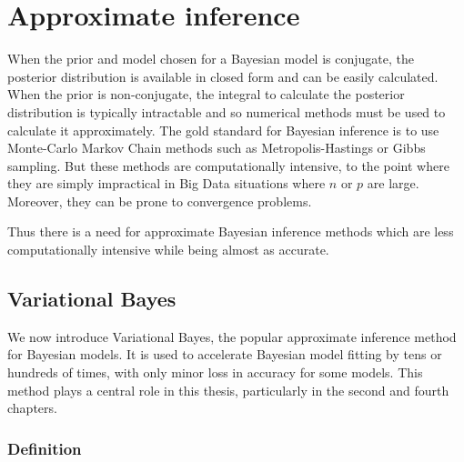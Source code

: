 

\section{Approximate inference}
When the prior and model chosen for a Bayesian model is conjugate, the posterior distribution is available in
closed form and can be easily calculated.
When the prior is non-conjugate, the integral to calculate the posterior distribution is typically intractable
and so numerical methods must be used to calculate it approximately.
The gold standard for Bayesian inference is to use Monte-Carlo Markov Chain methods such as Metropolis-Hastings
or Gibbs sampling. But these methods are computationally intensive, to the point where they are simply
impractical in Big Data situations where $n$ or $p$ are large. Moreover, they can be prone to convergence 
problems.

Thus there is a need for approximate Bayesian inference methods which are less computationally intensive while
being almost as accurate.

 
\subsection{Variational Bayes}
\label{sec:vb}

We now introduce Variational Bayes, the popular approximate inference method for Bayesian models. It is used
to accelerate Bayesian model fitting by tens or hundreds of times, with only minor loss in accuracy for some
models. This method plays a central role in this thesis, particularly in the second and fourth chapters.

\subsubsection{Definition}

